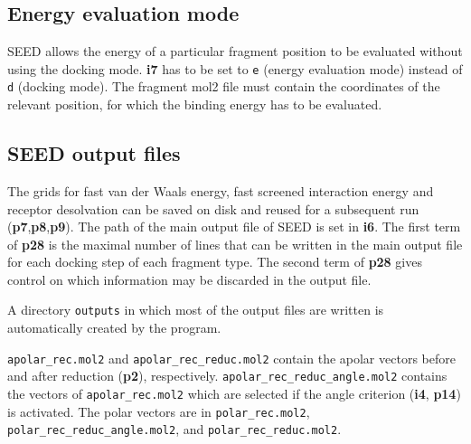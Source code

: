 \documentclass[a4paper,12pt,titlepage]{article}
\begin{document}


\subsection{Energy evaluation mode}
\label{ssec:Energy}

SEED allows the energy of a particular fragment position to be evaluated without using the docking mode. 
{\bf i7} has to be set to {\tt e} (energy evaluation mode) instead of {\tt d} (docking mode). 
The fragment mol2 file must contain the coordinates of the relevant position, for which the binding energy has to be evaluated.

\subsection{SEED output files}

The grids for fast van der Waals energy, fast screened interaction energy and receptor desolvation 
can be saved on disk and reused for a subsequent run ({\bf p7},{\bf p8},{\bf p9}). 
The path of the main output file of SEED is set in {\bf i6}. The first term of {\bf p28} is the 
maximal number of lines that can be written in the main output file for each docking step of each 
fragment type. The second term of {\bf p28} gives control on which information may be discarded 
in the output file.

\noindent
A directory {\tt outputs} in which most of the output files are written is automatically 
created by the program.

\noindent
{\tt apolar\_rec.mol2} and {\tt apolar\_rec\_reduc.mol2} contain the apolar vectors before and 
after reduction ({\bf p2}), respectively. 
{\tt apolar\_rec\_reduc\_angle.mol2} contains the vectors of {\tt apolar\_rec.mol2} which are 
selected if the angle criterion ({\bf i4}, {\bf p14}) is activated.
The polar vectors are in {\tt polar\_rec.mol2}, {\tt polar\_rec\_reduc\_angle.mol2}, and 
{\tt polar\_rec\_reduc.mol2}.
\end{document}
